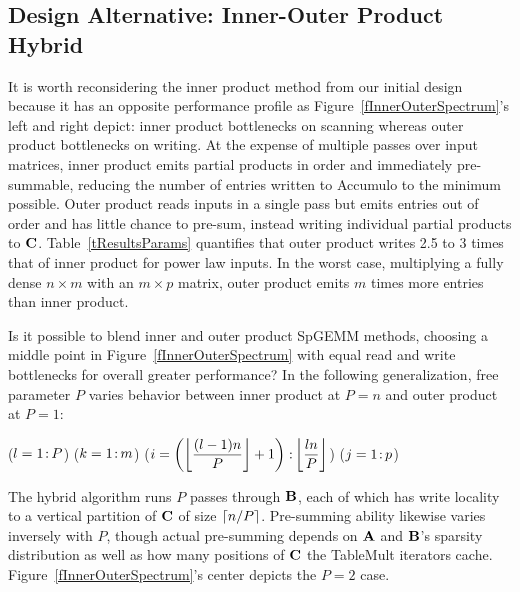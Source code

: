 \subsection{Design Alternative: Inner-Outer Product Hybrid}

It is worth reconsidering the inner product method from our initial design
because it has an opposite performance profile as 
Figure~\ref{fInnerOuterSpectrum}'s left and right depict: 
inner product bottlenecks on scanning whereas outer product bottlenecks on writing.
At the expense of multiple passes over input matrices, inner product emits 
partial products in order and immediately pre-summable,
reducing the number of entries written to Accumulo to the minimum possible.
Outer product reads inputs in a single pass
but emits entries out of order and has little chance to pre-sum, 
instead writing individual partial products to $\mathbf{C}$.
Table~\ref{tResultsParams} quantifies that outer product writes
2.5 to 3 times that of inner product for power law inputs.
In the worst case, multiplying a fully dense $n \times m$ with an $m \times p$ matrix,
outer product emits $m$ times more entries than inner product.



Is it possible to blend inner and outer product SpGEMM methods,
choosing a middle point in Figure~\ref{fInnerOuterSpectrum}
with equal read and write bottlenecks for overall greater performance?
In the following generalization, 
free parameter $P$ varies behavior between
inner product at $P=n$ and outer product at $P=1$:

\removelatexerror
\begin{algorithm}[H]
\vspace{\algspace}
\fore($l = 1\colon\! P$){
\fore($k = 1\colon\! m$){
\fore({$i = \left( \floor*{\dfrac{(l-1)n}{P}}+1 \right) \col \floor*{\dfrac{ln}{P}}$}){
\fore($j = 1\colon\! p$){
}}}}
\vspace{\algspace}
\end{algorithm}

The hybrid algorithm runs $P$ passes through $\mathbf{B}$,
each of which has write locality to a vertical partition of $\mathbf{C}$ of size $\lceil n / P\rceil$.
Pre-summing ability likewise varies inversely with $P$, 
though actual pre-summing depends on
$\mathbf{A}$ and $\mathbf{B}$'s  sparsity distribution
as well as how many positions of $\mathbf{C}$ the TableMult iterators cache.
Figure~\ref{fInnerOuterSpectrum}'s center depicts the $P=2$ case.

